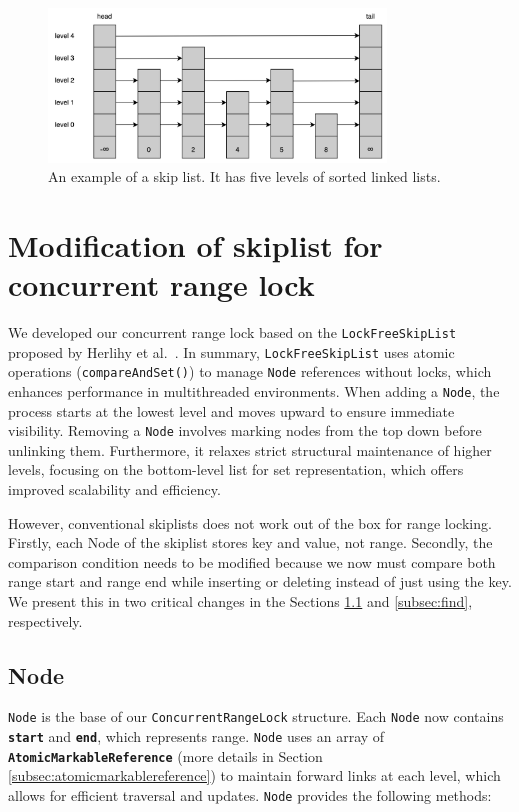 \begin{figure}[h!]
    \centering
    \includegraphics[width=0.8\textwidth]{./figures/skiplist.png}
    \caption{An example of a skip list. It has five levels of sorted linked lists.}
    \label{fig:skiplist}
\end{figure}

\section{Modification of skiplist for concurrent range lock}

We developed our concurrent range lock based on the \texttt{LockFreeSkipList} proposed by Herlihy et al.~\parencite{herlihy2020art}.
In summary, \texttt{LockFreeSkipList} uses atomic operations (\texttt{compareAndSet()}) to manage \texttt{Node} references without locks, which enhances performance in multithreaded environments.
When adding a \texttt{Node}, the process starts at the lowest level and moves upward to ensure immediate visibility.
Removing a \texttt{Node} involves marking nodes from the top down before unlinking them.
Furthermore, it relaxes strict structural maintenance of higher levels, focusing on the bottom-level list for set representation, which offers improved scalability and efficiency.

However, conventional skiplists does not work out of the box for range locking. Firstly, each Node of the skiplist stores key and value, not range. Secondly, the comparison condition needs to be modified because we now must compare both range start and range end while inserting or deleting instead of just using the key. We present this in two critical changes in the Sections \ref{subsec:node} and \ref{subsec:find}, respectively.

\subsection{Node}\label{subsec:node}

\texttt{Node} is the base of our \texttt{ConcurrentRangeLock} structure.
Each \texttt{Node} now contains \textbf{\texttt{start}} and \textbf{\texttt{end}}, which represents range.
\texttt{Node} uses an array of \textbf{\texttt{AtomicMarkableReference}} (more details in Section \ref{subsec:atomicmarkablereference}) to maintain forward links at each level, which allows for efficient traversal and updates. 
\texttt{Node} provides the following methods:

